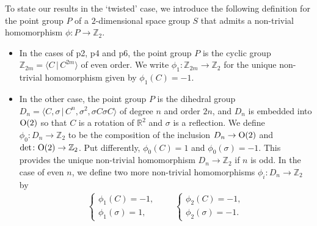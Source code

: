 \documentclass[pdftex]{sigma}
\theoremstyle{definition}
\newcommand{\R}{\mathbb{R}}
\newcommand{\Z}{\mathbb{Z}}
\begin{document}
To state our results in the `twisted' case, we introduce the following def\/inition for the point group $P$ of a $2$-dimensional space group $S$ that admits a non-trivial homomorphism $\phi\colon P \to \Z_2$.
\begin{itemize}\itemsep=0pt
\item
In the cases of \textsf{p2}, \textsf{p4} and \textsf{p6}, the point group $P$ is the cyclic group $\Z_{2m} = \langle C \,|\, C^{2m} \rangle$ of even order. We write $\phi_1\colon \Z_{2m} \to \Z_2$ for the unique non-trivial homomorphism given by $\phi_1(C) = -1$.

\item
In the other case, the point group $P$ is the dihedral group $D_n = \langle C, \sigma \,|\, C^n, \sigma^2, \sigma C \sigma C \rangle$
of degree $n$ and order $2n$, and $D_n$ is embedded into ${\rm O}(2)$ so that $C$ is a rotation of $\R^2$ and $\sigma$ is a ref\/lection. We def\/ine $\phi_0 \colon D_n \to \Z_2$ to be the composition of the inclusion $D_n \to {\rm O}(2)$ and $\det \colon {\rm O}(2) \to \Z_2$. Put dif\/ferently, $\phi_0(C) = 1$ and $\phi_0(\sigma) = -1$. This provides the unique non-trivial homomorphism $D_n \to \Z_2$ if $n$ is odd. In the case of even $n$, we def\/ine two more non-trivial homomorphisms $\phi_i \colon D_n \to \Z_2$ by
\begin{gather*}
\begin{cases}
\phi_1(C) = -1, \\
\phi_1(\sigma) = 1,
\end{cases} \qquad
\begin{cases}
\phi_2(C) = -1, \\
\phi_2(\sigma) = -1.
\end{cases}
\end{gather*}
\end{itemize}
\end{document}
